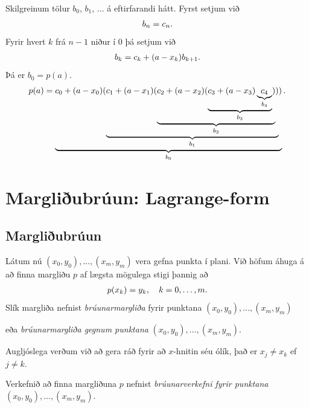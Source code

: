 \documentclass[A4paper,10pt,icelandic]{sphinxmanual}
\begin{document}
Skilgreinum tölur \(b_0\), \(b_1\), \(\ldots\) á
eftirfarandi hátt. Fyrst setjum við
\begin{gather}
\begin{split}b_n = c_n.\end{split}\notag
\end{gather}
Fyrir hvert \(k\) frá \(n-1\) niður í 0 þá setjum við
\begin{gather}
\begin{split}b_k = c_k + (a - x_k) b_{k+1}.\end{split}\notag
\end{gather}
Þá er \(b_0 = p(a)\).
\begin{gather}
\begin{split}p(a) =
    \underbrace{
      c_0 + (a-x_0)(
      \underbrace{
        c_1 + (a-x_1)(
          \underbrace{c_2 + (a-x_2)(
        \underbrace{c_3 + (a-x_3)
          \underbrace{c_4}_{b_4}
          }_{b_3})
        }_{b_2})
      }_{b_1})
    }_{b_0}.\end{split}\notag
\end{gather}

\section{Margliðubrúun: Lagrange-form}
\label{kafli03:margliubruun-lagrange-form}\label{kafli03:index-6}

\subsection{Margliðubrúun}
\label{kafli03:margliubruun}
Látum nú \((x_0,y_0), \ldots, (x_m,y_m)\) vera gefna punkta í plani.
Við höfum áhuga á að finna margliðu \(p\) af lægsta mögulega stigi
þannig að
\begin{gather}
\begin{split}p(x_k) = y_k, \quad k = 0, \ldots, m.\end{split}\notag
\end{gather}
Slík margliða nefnist \emph{brúunarmargliða} fyrir punktana
\((x_0,y_0), \ldots, (x_m,y_m)\)

eða \emph{brúunarmargliða gegnum punktana}
\((x_0,y_0), \ldots, (x_m,y_m)\).

Augljóslega verðum við að gera ráð fyrir að \(x\)-hnitin séu ólík,
það er \(x_j \not= x_k\) ef \(j \not= k\).

Verkefnið að finna margliðuna \(p\) nefnist \emph{brúunarverkefni fyrir
punktana} \((x_0,y_0), \ldots, (x_m,y_m)\).
\end{document}
